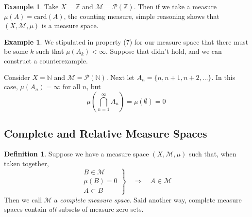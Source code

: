 \documentclass[12pt]{article}
\theoremstyle{plain}
\theoremstyle{definition}
\newtheorem{defn}[thm]{Definition}
\newtheorem{ex}[thm]{Example}
\theoremstyle{remark}
\begin{document}
\begin{ex}
Take $X=\mathbb{Z}$ and $\mathscr{M}=\mathscr{P}(\mathbb{Z})$. Then if we take a measure $\mu(A) = \text{card}\left( A \right)$, the counting measure, simple reasoning shows that $(X,\mathscr{M},\mu)$ is a measure space.
\end{ex}

\begin{ex}
We stipulated in property (7) for our measure space that there must be some $k$ such that $\mu(A_k)<\infty$. Suppose that didn't hold, and we can construct a counterexample. 
    
    Consider $X = \mathbb{N}$ and $\mathscr{M} =\mathscr{P}(\mathbb{N})$. Next let $A_n = \{n, n+1, n+2, \ldots\}$. In this case, $\mu(A_n) = \infty$ for all $n$, but
    \[ 
        \mu\left(\bigcap^\infty_{n=1} A_n\right) = 
        \mu(\emptyset) = 0
    \]
\end{ex}


\subsection{Complete and Relative Measure Spaces}

\begin{defn}
Suppose we have a measure space $(X,\mathscr{M},\mu)$ such that, when taken together,
\[
    \left.
    \begin{array}{r}
        B\in\mathscr{M} \\
        \mu(B) = 0\\
        A\subset B
    \end{array} \right\}
    \quad \Rightarrow\quad
    A\in\mathscr{M}
\]
Then we call $\mathscr{M}$ a \emph{complete measure space}. Said another way, complete measure spaces contain \emph{all} subsets of measure zero sets.
\end{defn}
\end{document}
